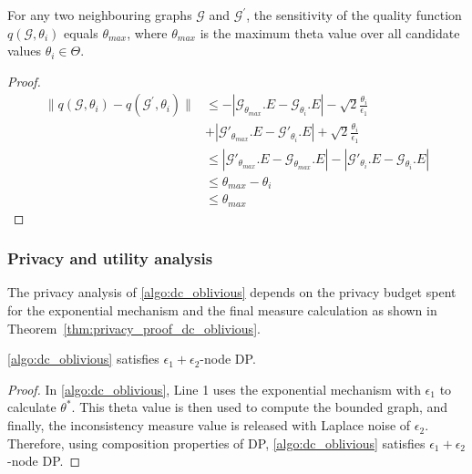 \begin{lemma}
    For any two neighbouring graphs $\mathcal{G}$ and $\mathcal{G}^\prime$, the sensitivity of the quality function $q(\mathcal{G}, \theta_i)$ equals $\theta_{max}$,
    where $\theta_{max}$ is the maximum theta value over all candidate values $\theta_i \in \Theta$.
\end{lemma}\label{lemma:sens_quality}
\begin{proof}
    \begin{equation*}
        \begin{split}
            \|q(\mathcal{G}, \theta_i) - q(\mathcal{G}^\prime, \theta_i)\| &\leq -|\mathcal{G}_{\theta_{max}}.E - \mathcal{G}_{\theta_i}.E| - \sqrt{2}\frac{\theta_i}{\epsilon_1} \\ &+ |\mathcal{G}'_{\theta_{max}}.E - \mathcal{G}'_{\theta_i}.E| + \sqrt{2}\frac{\theta_i}{\epsilon_1} \\
            &\leq |\mathcal{G}'_{\theta_{max}}.E - \mathcal{G}_{\theta_{max}}.E| - |\mathcal{G}'_{\theta_{i}}.E - \mathcal{G}_{\theta_{i}}.E|\\
            &\leq \theta_{max} - \theta_i \\
            &\leq \theta_{max}            
        \end{split}
    \end{equation*}
\end{proof}

\subsubsection{Privacy and utility analysis}\label{sec:dc_oblivious_privay_util}

The privacy analysis of \cref{algo:dc_oblivious} depends on the privacy budget spent for the exponential mechanism and the final measure calculation as shown in Theorem~\ref{thm:privacy_proof_dc_oblivious}.

\begin{theorem}\label{thm:privacy_proof_dc_oblivious}
    \cref{algo:dc_oblivious} satisfies $\epsilon_1 + \epsilon_2$-node DP.
\end{theorem}
\begin{proof}
    In \cref{algo:dc_oblivious}, Line 1 uses the exponential mechanism with $\epsilon_1$ to calculate $\theta^*$. This theta value is then used to compute the bounded graph, and finally, the inconsistency measure value is released with Laplace noise of $\epsilon_2$. Therefore, using composition properties of DP, \cref{algo:dc_oblivious} satisfies $\epsilon_1 + \epsilon_2$-node DP.
\end{proof}

